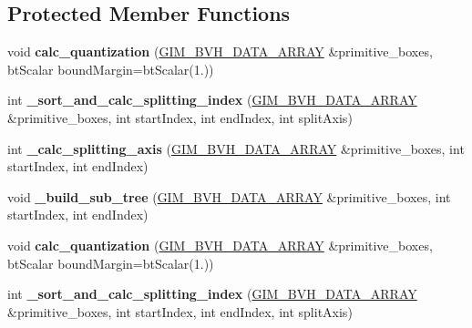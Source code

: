 \subsection*{Protected Member Functions}
\begin{DoxyCompactItemize}
\item 
\mbox{\label{classbtQuantizedBvhTree_a9cefb0a2a99cc31977f1e4caeec742b0}} 
void {\bfseries calc\+\_\+quantization} (\hyperlink{classGIM__BVH__DATA__ARRAY}{G\+I\+M\+\_\+\+B\+V\+H\+\_\+\+D\+A\+T\+A\+\_\+\+A\+R\+R\+AY} \&primitive\+\_\+boxes, bt\+Scalar bound\+Margin=bt\+Scalar(1.))
\item 
\mbox{\label{classbtQuantizedBvhTree_ab895904dbd5883d64f8ff88f9173ccf6}} 
int {\bfseries \+\_\+sort\+\_\+and\+\_\+calc\+\_\+splitting\+\_\+index} (\hyperlink{classGIM__BVH__DATA__ARRAY}{G\+I\+M\+\_\+\+B\+V\+H\+\_\+\+D\+A\+T\+A\+\_\+\+A\+R\+R\+AY} \&primitive\+\_\+boxes, int start\+Index, int end\+Index, int split\+Axis)
\item 
\mbox{\label{classbtQuantizedBvhTree_ac6044782124c9990682482d51313cb24}} 
int {\bfseries \+\_\+calc\+\_\+splitting\+\_\+axis} (\hyperlink{classGIM__BVH__DATA__ARRAY}{G\+I\+M\+\_\+\+B\+V\+H\+\_\+\+D\+A\+T\+A\+\_\+\+A\+R\+R\+AY} \&primitive\+\_\+boxes, int start\+Index, int end\+Index)
\item 
\mbox{\label{classbtQuantizedBvhTree_a815e8aeaa478e42b1a34bc256a95a26d}} 
void {\bfseries \+\_\+build\+\_\+sub\+\_\+tree} (\hyperlink{classGIM__BVH__DATA__ARRAY}{G\+I\+M\+\_\+\+B\+V\+H\+\_\+\+D\+A\+T\+A\+\_\+\+A\+R\+R\+AY} \&primitive\+\_\+boxes, int start\+Index, int end\+Index)
\item 
\mbox{\label{classbtQuantizedBvhTree_a9cefb0a2a99cc31977f1e4caeec742b0}} 
void {\bfseries calc\+\_\+quantization} (\hyperlink{classGIM__BVH__DATA__ARRAY}{G\+I\+M\+\_\+\+B\+V\+H\+\_\+\+D\+A\+T\+A\+\_\+\+A\+R\+R\+AY} \&primitive\+\_\+boxes, bt\+Scalar bound\+Margin=bt\+Scalar(1.))
\item 
\mbox{\label{classbtQuantizedBvhTree_ab895904dbd5883d64f8ff88f9173ccf6}} 
int {\bfseries \+\_\+sort\+\_\+and\+\_\+calc\+\_\+splitting\+\_\+index} (\hyperlink{classGIM__BVH__DATA__ARRAY}{G\+I\+M\+\_\+\+B\+V\+H\+\_\+\+D\+A\+T\+A\+\_\+\+A\+R\+R\+AY} \&primitive\+\_\+boxes, int start\+Index, int end\+Index, int split\+Axis)

\end{DoxyCompactItemize}
